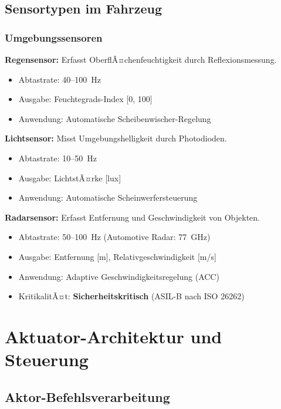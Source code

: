 ﻿\documentclass[a4paper,12pt]{article}
\begin{document}
\subsection{Sensortypen im Fahrzeug}

\subsubsection{Umgebungssensoren}

\textbf{Regensensor:} Erfasst OberflÃ¤chenfeuchtigkeit durch Reflexionsmessung.
\begin{itemize}
	\item Abtastrate: 40--100~Hz
	\item Ausgabe: Feuchtegrads-Index [0, 100]
	\item Anwendung: Automatische Scheibenwischer-Regelung
\end{itemize}

\textbf{Lichtsensor:} Misst Umgebungshelligkeit durch Photodioden.
\begin{itemize}
	\item Abtastrate: 10--50~Hz
	\item Ausgabe: LichtstÃ¤rke [lux]
	\item Anwendung: Automatische Scheinwerfersteuerung
\end{itemize}

\textbf{Radarsensor:} Erfasst Entfernung und Geschwindigkeit von Objekten.
\begin{itemize}
	\item Abtastrate: 50--100~Hz (Automotive Radar: 77~GHz)
	\item Ausgabe: Entfernung [m], Relativgeschwindigkeit [m/s]
	\item Anwendung: Adaptive Geschwindigkeitsregelung (ACC)
	\item KritikalitÃ¤t: \textbf{Sicherheitskritisch} (ASIL-B nach ISO 26262)
\end{itemize}

\section{Aktuator-Architektur und Steuerung}

\subsection{Aktor-Befehlsverarbeitung}
\end{document}
